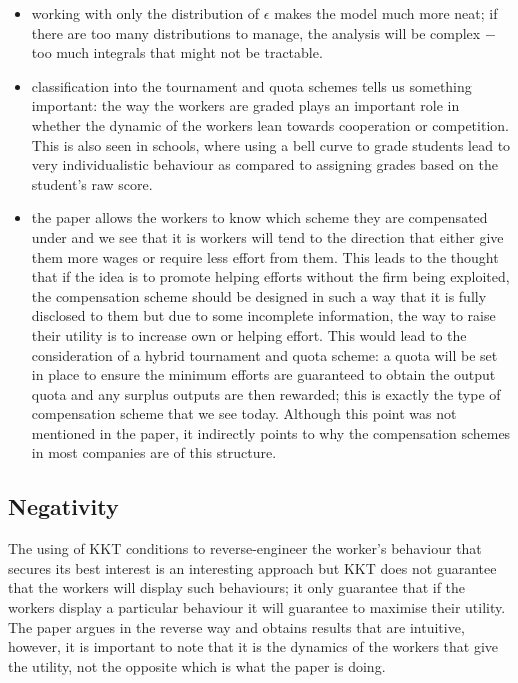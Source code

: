 \documentclass[a4paper,10pt]{article}
\theoremstyle{definition}
\begin{document}
\begin{itemize}
\item working with only the distribution of $\epsilon$ makes the model much more neat; if there are too many distributions to manage, the analysis will be complex $-$ too much integrals that might not be tractable.


\item classification into the tournament and quota schemes tells us something important: the way the workers are graded plays an important role in whether the dynamic of the workers lean towards cooperation or competition. This is also seen in schools, where using a bell curve to grade students lead to very individualistic behaviour as compared to assigning grades based on the student's raw score.

\item the paper allows the workers to know which scheme they are compensated under and we see that it is workers will tend to the direction that either give them more wages or require less effort from them. This leads to the thought that if the idea is to promote helping efforts without the firm being exploited, the compensation scheme should be designed in such a way that it is fully disclosed to them but due to some incomplete information, the way to raise their utility is to increase own or helping effort. This would lead to the consideration of a hybrid tournament and quota scheme:  a quota will be set in place to ensure the minimum efforts are guaranteed to obtain the output quota and any surplus outputs are then rewarded; this is exactly the type of compensation scheme that we see today. Although this point was not mentioned in the paper, it indirectly points to why the compensation schemes in most companies are of this structure. 
\end{itemize}


\subsection*{Negativity}
The using of KKT conditions to reverse-engineer the worker's behaviour that secures its best interest is an interesting approach but KKT does not guarantee that the workers will display such behaviours; it only guarantee that if the workers display a particular behaviour it will guarantee to maximise their utility. The paper argues in the reverse way and obtains results that are intuitive, however, it is important to note that it is the dynamics of the workers that give the utility, not the opposite which is what the paper is doing.
\end{document}
